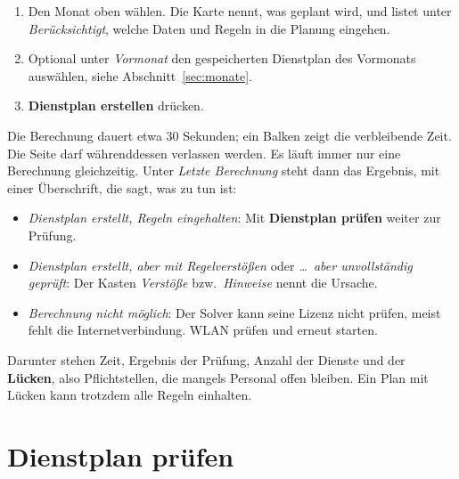 \documentclass[11pt]{combiArticle}
\newcommand{\knopf}[1]{\textbf{#1}}
\begin{document}
\begin{enumerate}
  \item Den Monat oben wählen. Die Karte nennt, was geplant wird, und listet unter \emph{Berücksichtigt}, welche
        Daten und Regeln in die Planung eingehen.
  \item Optional unter \emph{Vormonat} den gespeicherten Dienstplan des Vormonats auswählen, siehe
        Abschnitt~\ref{sec:monate}.
  \item \knopf{Dienstplan erstellen} drücken.
\end{enumerate}
Die Berechnung dauert etwa 30 Sekunden; ein Balken zeigt die verbleibende Zeit. Die Seite darf währenddessen
verlassen werden. Es läuft immer nur eine Berechnung gleichzeitig. Unter \emph{Letzte Berechnung} steht dann das
Ergebnis, mit einer Überschrift, die sagt, was zu tun ist:
\begin{itemize}
  \item \emph{Dienstplan erstellt, Regeln eingehalten}: Mit \knopf{Dienstplan prüfen} weiter zur Prüfung.
  \item \emph{Dienstplan erstellt, aber mit Regelverstößen} oder \emph{\dots\ aber unvollständig geprüft}: Der
        Kasten \emph{Verstöße} bzw.\ \emph{Hinweise} nennt die Ursache.
  \item \emph{Berechnung nicht möglich}: Der Solver kann seine Lizenz nicht prüfen, meist fehlt die
        Internetverbindung. WLAN prüfen und erneut starten.
\end{itemize}
Darunter stehen Zeit, Ergebnis der Prüfung, Anzahl der Dienste und der \textbf{Lücken}, also Pflichtstellen, die
mangels Personal offen bleiben. Ein Plan mit Lücken kann trotzdem alle Regeln einhalten.

\section{Dienstplan prüfen}\label{sec:pruefen}
\end{document}
